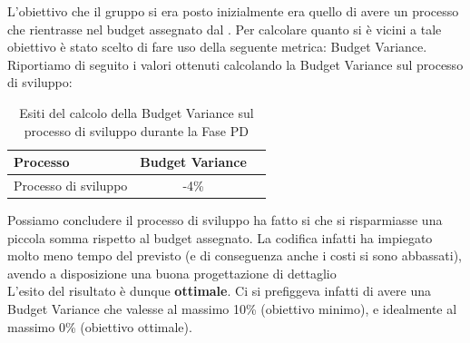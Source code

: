 				L'obiettivo che il gruppo si era posto inizialmente era quello di avere un processo che rientrasse nel budget assegnato dal . Per calcolare quanto si è vicini a tale obiettivo è stato scelto di fare uso della seguente metrica: Budget Variance.\\
				Riportiamo di seguito i valori ottenuti calcolando la Budget Variance sul processo di sviluppo:
				\begin{table}[H]
					\centering
					\begin{tabu}{| l | c | c |}
						\hline
						Processo 			   & Budget Variance     \\ \hline \hline
						Processo di sviluppo   & -4\%                 \\ \hline
					\end{tabu}
					\caption{Esiti del calcolo della Budget Variance sul processo di sviluppo durante la Fase PD}
				\end{table}
				Possiamo concludere il processo di sviluppo ha fatto si che si risparmiasse una piccola somma rispetto al budget assegnato. La codifica infatti ha impiegato molto meno tempo del previsto (e di conseguenza anche i costi si sono abbassati), avendo a disposizione una buona progettazione di dettaglio\\
				L'esito del risultato è dunque \textbf{ottimale}. Ci si prefiggeva infatti di avere una Budget Variance che valesse al massimo 10\% (obiettivo minimo), e idealmente al massimo 0\% (obiettivo ottimale).
							
